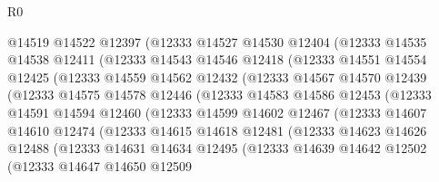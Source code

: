 \begin{lexlean}{R0}
\begin{coremodule}
                @14519
                @14522
                @12397
                (@12333
                  @14527
                  @14530
                  @12404
                  (@12333
                    @14535
                    @14538
                    @12411
                    (@12333
                      @14543
                      @14546
                      @12418
                      (@12333
                        @14551
                        @14554
                        @12425
                        (@12333
                          @14559
                          @14562
                          @12432
                          (@12333
                            @14567
                            @14570
                            @12439
                            (@12333
                              @14575
                              @14578
                              @12446
                              (@12333
                                @14583
                                @14586
                                @12453
                                (@12333
                                  @14591
                                  @14594
                                  @12460
                                  (@12333
                                    @14599
                                    @14602
                                    @12467
                                    (@12333
                                      @14607
                                      @14610
                                      @12474
                                      (@12333
                                        @14615
                                        @14618
                                        @12481
                                        (@12333
                                          @14623
                                          @14626
                                          @12488
                                          (@12333
                                            @14631
                                            @14634
                                            @12495
                                            (@12333
                                              @14639
                                              @14642
                                              @12502
                                              (@12333
                                                @14647
                                                @14650
                                                @12509

\end{coremodule}
\end{lexlean}
